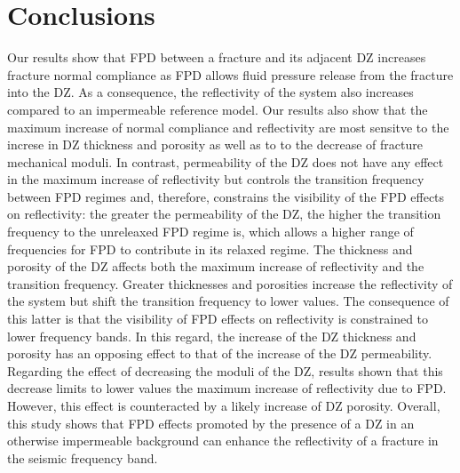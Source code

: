 \documentclass[draft]{agujournal2019}
\begin{document}
\section{Conclusions}

Our results show that FPD between a fracture and its adjacent DZ increases fracture normal compliance as FPD allows fluid pressure release from the fracture into the DZ.
As a consequence, the reflectivity of the system also increases compared to an impermeable reference model. 
Our results also show that the maximum  increase of normal compliance  and reflectivity are most sensitve to the increse in DZ thickness and porosity as well as to to the decrease of fracture mechanical moduli. In contrast, permeability of the DZ does not have any effect in the maximum increase of reflectivity but controls the transition frequency between FPD regimes and, therefore, constrains the visibility of the FPD effects on reflectivity: the greater the permeability of the DZ, the higher the transition frequency to the unreleaxed FPD regime is, which allows a higher range of frequencies for FPD to contribute in its relaxed regime. The thickness and porosity of the DZ affects both the maximum increase of reflectivity and the transition frequency. Greater thicknesses and porosities increase the reflectivity of the system but shift the transition frequency to lower values. The consequence of this latter is that the visibility of FPD effects on  reflectivity is constrained to lower frequency bands. In this regard, the increase of the DZ thickness and porosity has an opposing effect to that of the increase of the DZ permeability.
Regarding the effect of decreasing the moduli of the DZ, results shown that this decrease limits to lower values the maximum increase of reflectivity due to FPD. However, this effect is counteracted by a likely increase of DZ porosity.
Overall, this study shows that FPD effects promoted by the presence of a DZ in an otherwise impermeable background can enhance the reflectivity of a fracture in the seismic frequency band.







\end{document}
